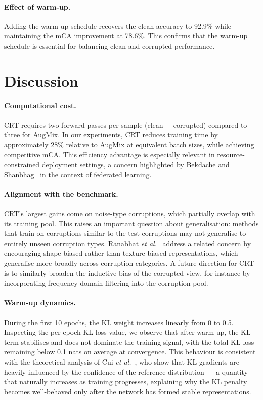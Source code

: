 \documentclass[10pt,twocolumn]{article}
\begin{document}
\paragraph{Effect of warm-up.} Adding the warm-up schedule recovers the clean accuracy to 92.9\% while maintaining the mCA improvement at 78.6\%. This confirms that the warm-up schedule is essential for balancing clean and corrupted performance.

\section{Discussion}

\paragraph{Computational cost.} CRT requires two forward passes per sample (clean + corrupted) compared to three for AugMix. In our experiments, CRT reduces training time by approximately 28\% relative to AugMix at equivalent batch sizes, while achieving competitive mCA. This efficiency advantage is especially relevant in resource-constrained deployment settings, a concern highlighted by Bekdache and Shanbhag~\cite{bekdache2025federl} in the context of federated learning.

\paragraph{Alignment with the benchmark.} CRT's largest gains come on noise-type corruptions, which partially overlap with its training pool. This raises an important question about generalisation: methods that train on corruptions similar to the test corruptions may not generalise to entirely unseen corruption types. Ranabhat \emph{et al.}~\cite{ranabhat2025shapebias} address a related concern by encouraging shape-biased rather than texture-biased representations, which generalise more broadly across corruption categories. A future direction for CRT is to similarly broaden the inductive bias of the corrupted view, for instance by incorporating frequency-domain filtering into the corruption pool.

\paragraph{Warm-up dynamics.}  During the first 10 epochs, the KL weight increases linearly from 0 to 0.5. Inspecting the per-epoch KL loss value, we observe that after warm-up, the KL term stabilises and does not dominate the training signal, with the total KL loss remaining below 0.1 nats on average at convergence. This behaviour is consistent with the theoretical analysis of Cui \emph{et al.}~\cite{cui2025gkl}, who show that KL gradients are heavily influenced by the confidence of the reference distribution --- a quantity that naturally increases as training progresses, explaining why the KL penalty becomes well-behaved only after the network has formed stable representations.
\end{document}
